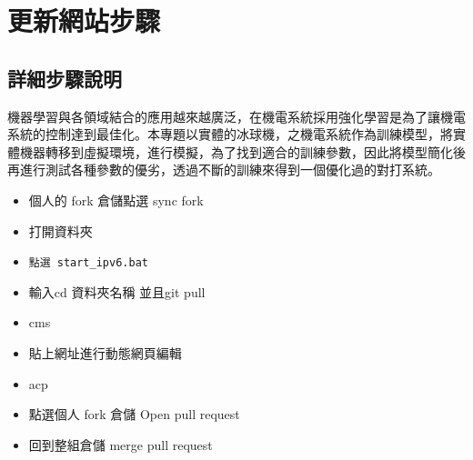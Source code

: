 \chapter{更新網站步驟}
\renewcommand{\baselinestretch}{10.0} %
\setcounter{page}{1}  %
\fontsize{14pt}{2.5pt}\sectionef
\section{詳細步驟說明}
機器學習與各領域結合的應用越來越廣泛，在機電系統採用強化學習是為了讓機電系統的控制達到最佳化。本專題以實體的冰球機，之機電系統作為訓練模型，將實體機器轉移到虛擬環境，進行模擬，為了找到適合的訓練參數，因此將模型簡化後再進行測試各種參數的優劣，透過不斷的訓練來得到一個優化過的對打系統。\\
\begin{itemize}
\item 個人的 fork 倉儲點選 sync fork 
\item 打開資料夾 
\item \texttt{點選 start\_ipv6.bat}
\item 輸入cd 資料夾名稱 並且git pull 
\item cms 
\item 貼上網址進行動態網頁編輯 
\item acp 
\item 點選個人 fork 倉儲 Open pull request 
\item 回到整組倉儲 merge pull request
\end{itemize}
